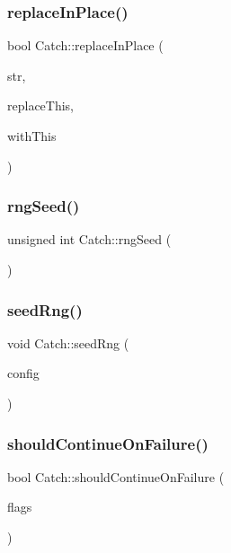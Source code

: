 \subsubsection{\texorpdfstring{replace\+In\+Place()}{replaceInPlace()}}
{\footnotesize\ttfamily bool Catch\+::replace\+In\+Place (\begin{DoxyParamCaption}\item[{std\+::string \&}]{str,  }\item[{std\+::string const \&}]{replace\+This,  }\item[{std\+::string const \&}]{with\+This }\end{DoxyParamCaption})}

\hypertarget{namespace_catch_acf5ea05e942d2d7fe79111e12754ed76}{}\label{namespace_catch_acf5ea05e942d2d7fe79111e12754ed76} 
\subsubsection{\texorpdfstring{rng\+Seed()}{rngSeed()}}
{\footnotesize\ttfamily unsigned int Catch\+::rng\+Seed (\begin{DoxyParamCaption}{ }\end{DoxyParamCaption})}

\hypertarget{namespace_catch_a161400810eb0995394d6d8d3cae821ad}{}\label{namespace_catch_a161400810eb0995394d6d8d3cae821ad} 
\subsubsection{\texorpdfstring{seed\+Rng()}{seedRng()}}
{\footnotesize\ttfamily void Catch\+::seed\+Rng (\begin{DoxyParamCaption}\item[{I\+Config const \&}]{config }\end{DoxyParamCaption})}

\hypertarget{namespace_catch_a7f7480b15d74965459c844f0d393ed87}{}\label{namespace_catch_a7f7480b15d74965459c844f0d393ed87} 
\subsubsection{\texorpdfstring{should\+Continue\+On\+Failure()}{shouldContinueOnFailure()}}
{\footnotesize\ttfamily bool Catch\+::should\+Continue\+On\+Failure (\begin{DoxyParamCaption}\item[{int}]{flags }\end{DoxyParamCaption})\hspace{0.3cm}{\ttfamily [inline]}}




